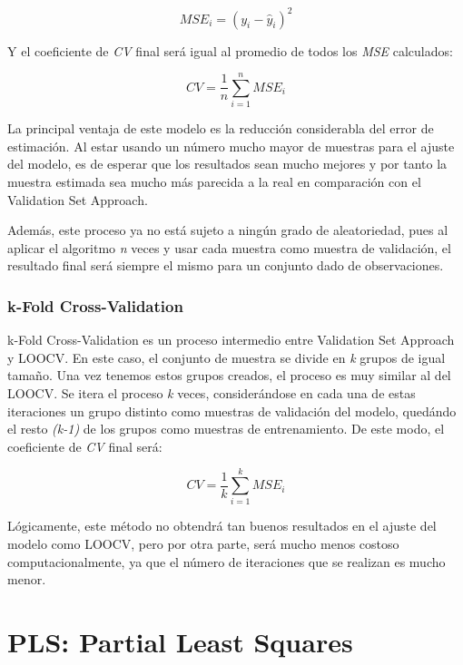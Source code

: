 \documentclass[12pt,a4paper,Spanish]{book}
\begin{document}
\begin{equation}
MSE_i=(y_i-\hat{y}_i)^2
\end{equation}

Y el coeficiente de \textit{CV} final será igual al promedio de todos los \textit{MSE} calculados:

\begin{equation}
CV=\dfrac{1}{n}\sum_{i=1}^{n}MSE_i
\end{equation}

La principal ventaja de este modelo es la reducción considerabla del error de estimación. Al estar usando un número mucho mayor de muestras para el ajuste del modelo, es de esperar que los resultados sean mucho mejores y por tanto la muestra estimada sea mucho más parecida a la real en comparación con el Validation Set Approach.

Además, este proceso ya no está sujeto a ningún grado de aleatoriedad, pues al aplicar el algoritmo \textit{n} veces y usar cada muestra como muestra de validación, el resultado final será siempre el mismo para un conjunto dado de observaciones.



\subsection{k-Fold Cross-Validation}

k-Fold Cross-Validation es un proceso intermedio entre Validation Set Approach y LOOCV. En este caso, el conjunto de muestra se divide en \textit{k} grupos de igual tamaño. Una vez tenemos estos grupos creados, el proceso es muy similar al del LOOCV. Se itera el proceso \textit{k} veces, considerándose en cada una de estas iteraciones un grupo distinto como muestras de validación del modelo, quedándo el resto \textit{(k-1)} de los grupos como muestras de entrenamiento. De este modo, el coeficiente de \textit{CV} final será:

\begin{equation}
CV=\dfrac{1}{k}\sum_{i=1}^{k}MSE_i
\end{equation}

Lógicamente, este método no obtendrá tan buenos resultados en el ajuste del modelo como LOOCV, pero por otra parte, será mucho menos costoso computacionalmente, ya que el número de iteraciones que se realizan es mucho menor.

\chapter{PLS: Partial Least Squares}
\end{document}

